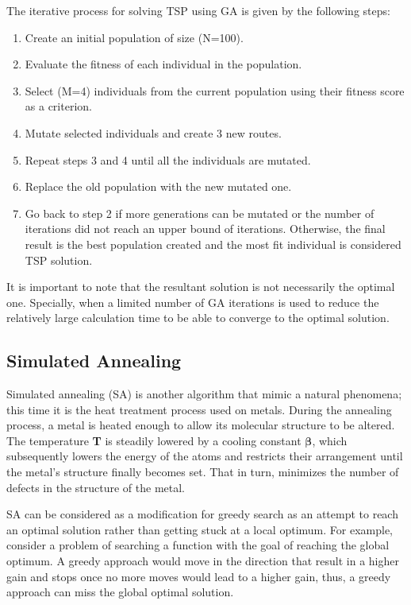 \documentclass[twocolumn]{article}
\begin{document}
	The iterative process for solving TSP using GA is given by the following steps:
	\begin{enumerate}
		\item Create an initial population of size (N=100).
		\item Evaluate the fitness of each individual in the population.
		\item Select (M=4) individuals from the current population using their fitness score as a criterion.
		\item Mutate selected individuals and create 3 new routes.
		\item Repeat steps 3 and 4 until all the individuals are mutated.
		\item Replace the old population with the new mutated one.
		\item Go back to step 2 if more generations can be mutated or the number of iterations did not reach an upper bound of iterations. Otherwise, the final result is the best population created and the most fit individual is considered TSP solution.  
	\end{enumerate}
	It is important to note that the resultant solution is not necessarily the optimal one. Specially, when a limited number of GA iterations is used to reduce the relatively large calculation time to be able to converge to the optimal solution.
	
	\subsection{Simulated Annealing}
	Simulated annealing (SA) is another algorithm that mimic a natural phenomena; this time it is the heat treatment process used on metals. During the annealing process, a metal is heated enough to allow its molecular structure to be altered. The temperature {\bfseries T} is steadily lowered by a cooling constant {$\boldsymbol \beta$}, which subsequently lowers the energy of the atoms and restricts their arrangement until the metal's structure finally becomes set. That in turn, minimizes the number of defects in the structure of the metal.
	 
	SA can be considered as a modification for greedy search as an attempt to reach an optimal solution rather than getting stuck at a local optimum. For example, consider a problem of searching a function with the goal of reaching the global optimum. A greedy approach would move in the direction that result in a higher gain and stops once no more moves would lead to a higher gain, thus, a greedy approach can miss the global optimal solution.
	 
\end{document}
